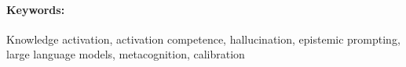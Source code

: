 \paragraph{Keywords:}
Knowledge activation, activation competence, hallucination, epistemic prompting, large language models, metacognition, calibration


%
%
%
